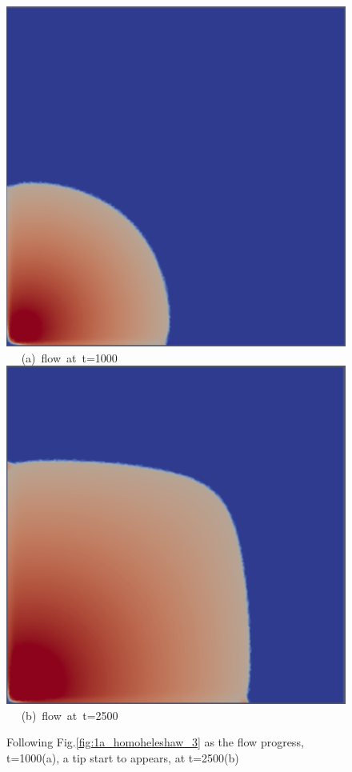 \begin{figure}[ht] 
\vbox{
\hbox{\hspace{3.5cm}
\includegraphics[width=.5\textwidth]{./Pics1/Saffman_homogeneous_MR3/saffman_homo_fixed_1000.pdf} 
}
\vspace{0.0cm}
\hbox{\hspace{5.0cm} (a) flow at t=1000   
}
\vspace{0.25cm}
\hbox{\hspace{3.5cm}
\includegraphics[width=.5\textwidth]{./Pics1/Saffman_homogeneous_MR3/saffman_homo_fixed_2500.pdf}
}
\vspace{0.0cm}
\hbox{\hspace{5.0cm} (b) flow at t=2500  
}
}     
\caption{Following Fig.\ref{fig:1a_homoheleshaw_3} as the flow progress, t=1000(a), a tip start to appears, at t=2500(b)}
\label{fig:1b_homoheleshaw_3}
\end{figure}



